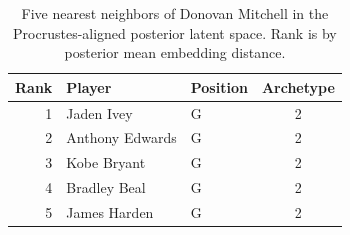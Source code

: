\begin{table}[htbp]
  \centering\small
  \begin{tabular}{rllc}
    \toprule
    Rank & Player & Position & Archetype \\
    \midrule
    1 & Jaden Ivey & G & 2 \\
    2 & Anthony Edwards & G & 2 \\
    3 & Kobe Bryant & G & 2 \\
    4 & Bradley Beal & G & 2 \\
    5 & James Harden & G & 2 \\
    \bottomrule
  \end{tabular}
  \caption{Five nearest neighbors of Donovan Mitchell in the Procrustes-aligned posterior latent space. Rank is by posterior mean embedding distance.}
  \label{tab:Donovan_Mitchell_neighbors}
\end{table}

